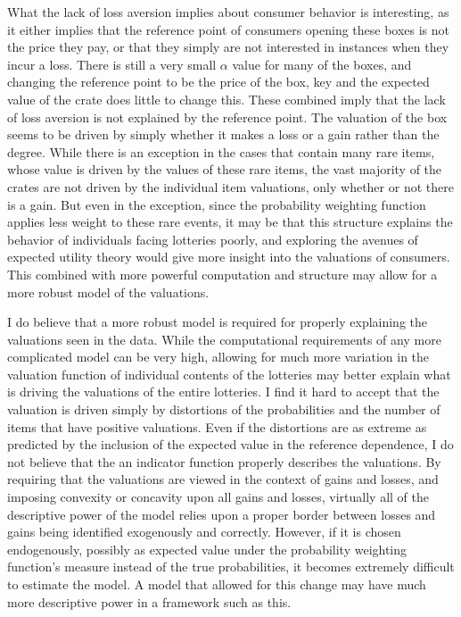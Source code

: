 \documentclass[12pt, letterpaper]{paper}
\begin{document}
What the lack of loss aversion implies about consumer behavior is
interesting, as it either implies that the reference point of
consumers opening these boxes is not the price they pay, or that they
simply are not interested in instances when they incur a loss. There
is still a very small $\alpha$ value for many of the boxes, and changing the
reference point to be the price of the box, key and the expected value
of the crate does little to change this. These combined imply that the
lack of loss aversion is not explained by the reference point. The
valuation of the box seems to be driven by simply whether it makes a
loss or a gain rather than the degree. While there is an exception in
the cases that contain many rare items, whose value is driven by the
values of these rare items, the vast majority of the crates are not
driven by the individual item valuations, only whether or not there is
a gain. But even in the exception, since the probability weighting
function applies less weight to these rare events, it may be that this
structure explains the behavior of individuals facing
lotteries poorly, and exploring the avenues of expected utility theory would
give more insight into the valuations of consumers. This combined with
more powerful computation and structure may allow for a more robust
model of the valuations.

I do believe that a more robust model is required for properly
explaining the valuations seen in the data. While the computational
requirements of any more complicated model can be very high, allowing
for much more variation in the valuation function of individual
contents of the lotteries may better explain what is driving the
valuations of the entire lotteries. I find it hard to accept that the
valuation is driven simply by distortions of the probabilities and the
number of items that have positive valuations. Even if the distortions
are as extreme as predicted by the inclusion of the expected value in
the reference dependence, I do not believe that the an indicator
function properly describes the valuations. By requiring that the
valuations are viewed in the context of gains and losses, and imposing
convexity or concavity upon all gains and losses, virtually all of the
descriptive power of the model relies upon a proper border between
losses and gains being identified exogenously and correctly. However,
if it is chosen endogenously, possibly as expected value under the
probability weighting function's measure instead of the true
probabilities, it becomes extremely difficult to estimate the model. A
model that allowed for this change may have much more descriptive
power in a framework such as this.

\section{}
\label{sec-7}
\nocite{Efficiency}
\nocite{DoubleAuc}
\nocite{LimeBoy}
\nocite{LitReview}
\nocite{Liquidpedia}
\nocite{SteamMarket}


\end{document}
